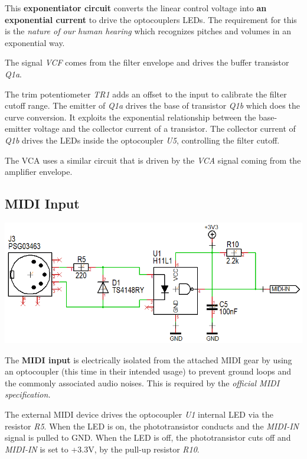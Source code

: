 \documentclass{scrartcl}
\begin{document}
This \textbf{exponentiator circuit} converts the linear control voltage into \textbf{an exponential current} to drive the optocouplers LEDs.
The requirement for this is the \emph{nature of our human hearing} which recognizes pitches and volumes in an exponential way.

\pagebreak
The signal \emph{VCF} comes from the filter envelope and drives the buffer transistor \emph{Q1a}.

The trim potentiometer \emph{TR1} adds an offset to the input to calibrate the filter cutoff range. The emitter of \emph{Q1a} drives the base of transistor \emph{Q1b} which does the curve conversion.
It exploits the exponential relationship between the base-emitter voltage and the collector current of a transistor.
The collector current of \emph{Q1b} drives the LEDs inside the optocoupler \emph{U5}, controlling the filter cutoff.

The VCA uses a similar circuit that is driven by the \emph{VCA} signal coming from the amplifier envelope.

\subsection{MIDI Input}

\begin{center}
    \includegraphics[scale=0.68]{assets/schema-midi.png}
\end{center}

The \textbf{MIDI input} is electrically isolated from the attached MIDI gear by using an optocoupler (this time in their intended usage) to prevent ground loops and the commonly associated audio noises.
This is required by the \emph{official MIDI specification.}

The external MIDI device drives the optocoupler \emph{U1} internal LED via the resistor \emph{R5}. When the LED is on, the phototransistor conducts and the \emph{MIDI-IN} signal is pulled to GND.
When the LED is off, the phototransistor cuts off and \emph{MIDI-IN} is set to +3.3V, by the pull-up resistor \emph{R10}.
\end{document}
